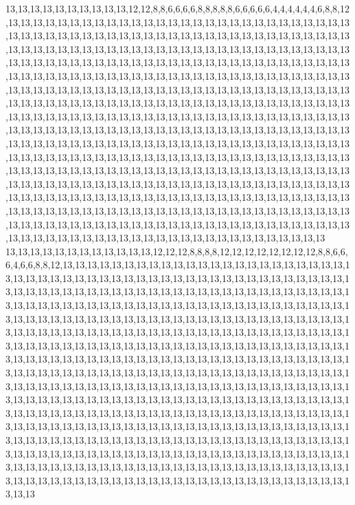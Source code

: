 13,13,13,13,13,13,13,13,13,13,12,12,8,8,6,6,6,6,8,8,8,8,8,6,6,6,6,6,4,4,4,4,4,4,6,8,8,12,13,13,13,13,13,13,13,13,13,13,13,13,13,13,13,13,13,13,13,13,13,13,13,13,13,13,13,13,13,13,13,13,13,13,13,13,13,13,13,13,13,13,13,13,13,13,13,13,13,13,13,13,13,13,13,13,13,13,13,13,13,13,13,13,13,13,13,13,13,13,13,13,13,13,13,13,13,13,13,13,13,13,13,13,13,13,13,13,13,13,13,13,13,13,13,13,13,13,13,13,13,13,13,13,13,13,13,13,13,13,13,13,13,13,13,13,13,13,13,13,13,13,13,13,13,13,13,13,13,13,13,13,13,13,13,13,13,13,13,13,13,13,13,13,13,13,13,13,13,13,13,13,13,13,13,13,13,13,13,13,13,13,13,13,13,13,13,13,13,13,13,13,13,13,13,13,13,13,13,13,13,13,13,13,13,13,13,13,13,13,13,13,13,13,13,13,13,13,13,13,13,13,13,13,13,13,13,13,13,13,13,13,13,13,13,13,13,13,13,13,13,13,13,13,13,13,13,13,13,13,13,13,13,13,13,13,13,13,13,13,13,13,13,13,13,13,13,13,13,13,13,13,13,13,13,13,13,13,13,13,13,13,13,13,13,13,13,13,13,13,13,13,13,13,13,13,13,13,13,13,13,13,13,13,13,13,13,13,13,13,13,13,13,13,13,13,13,13,13,13,13,13,13,13,13,13,13,13,13,13,13,13,13,13,13,13,13,13,13,13,13,13,13,13,13,13,13,13,13,13,13,13,13,13,13,13,13,13,13,13,13,13,13,13,13,13,13,13,13,13,13,13,13,13,13,13,13,13,13,13,13,13,13,13,13,13,13,13,13,13,13,13,13,13,13,13,13,13,13,13,13,13,13,13,13,13,13,13,13,13,13,13,13,13,13,13,13,13,13,13,13,13,13,13,13,13,13,13,13,13,13,13,13,13,13,13,13,13,13,13,13,13,13,13,13,13,13,13,13,13,13,13,13,13,13,13,13,13,13,13,13,13,13,13,13,13,13,13,13,13,13,13,13,13,13,13,13,13,13,13,13,13,13,13,13,13,13,13,13,13,13,13,13,13
13,13,13,13,13,13,13,13,13,13,13,13,12,12,12,8,8,8,8,12,12,12,12,12,12,12,12,8,8,6,6,6,4,6,6,8,8,12,13,13,13,13,13,13,13,13,13,13,13,13,13,13,13,13,13,13,13,13,13,13,13,13,13,13,13,13,13,13,13,13,13,13,13,13,13,13,13,13,13,13,13,13,13,13,13,13,13,13,13,13,13,13,13,13,13,13,13,13,13,13,13,13,13,13,13,13,13,13,13,13,13,13,13,13,13,13,13,13,13,13,13,13,13,13,13,13,13,13,13,13,13,13,13,13,13,13,13,13,13,13,13,13,13,13,13,13,13,13,13,13,13,13,13,13,13,13,13,13,13,13,13,13,13,13,13,13,13,13,13,13,13,13,13,13,13,13,13,13,13,13,13,13,13,13,13,13,13,13,13,13,13,13,13,13,13,13,13,13,13,13,13,13,13,13,13,13,13,13,13,13,13,13,13,13,13,13,13,13,13,13,13,13,13,13,13,13,13,13,13,13,13,13,13,13,13,13,13,13,13,13,13,13,13,13,13,13,13,13,13,13,13,13,13,13,13,13,13,13,13,13,13,13,13,13,13,13,13,13,13,13,13,13,13,13,13,13,13,13,13,13,13,13,13,13,13,13,13,13,13,13,13,13,13,13,13,13,13,13,13,13,13,13,13,13,13,13,13,13,13,13,13,13,13,13,13,13,13,13,13,13,13,13,13,13,13,13,13,13,13,13,13,13,13,13,13,13,13,13,13,13,13,13,13,13,13,13,13,13,13,13,13,13,13,13,13,13,13,13,13,13,13,13,13,13,13,13,13,13,13,13,13,13,13,13,13,13,13,13,13,13,13,13,13,13,13,13,13,13,13,13,13,13,13,13,13,13,13,13,13,13,13,13,13,13,13,13,13,13,13,13,13,13,13,13,13,13,13,13,13,13,13,13,13,13,13,13,13,13,13,13,13,13,13,13,13,13,13,13,13,13,13,13,13,13,13,13,13,13,13,13,13,13,13,13,13,13,13,13,13,13,13,13,13,13,13,13,13,13,13,13,13,13,13,13,13,13,13,13,13,13,13,13,13,13,13,13,13,13,13,13,13,13,13,13,13,13,13,13,13,13,13,13,13,13,13,13,13,13,13,13,13,13
